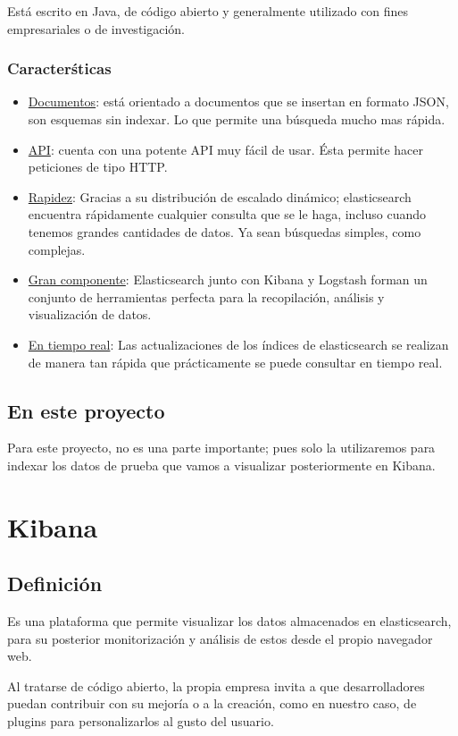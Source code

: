 \documentclass[a4paper, 12pt]{book}
\begin{document}
Est\'a escrito en Java, de c\'odigo abierto y generalmente utilizado con fines empresariales o de investigaci\'on.
\subsubsection{Caracter\'sticas}
\begin{itemize}
\item \underline{Documentos}: est\'a orientado a documentos que se insertan en formato JSON, son esquemas sin indexar. Lo que permite una b\'usqueda mucho mas r\'apida.
\item \underline{API}: cuenta con una potente API muy f\'acil de usar. \'Esta permite hacer peticiones de tipo HTTP.
\item \underline{Rapidez}: Gracias a su distribuci\'on de escalado din\'amico; elasticsearch encuentra r\'apidamente cualquier consulta que se le haga, incluso cuando tenemos grandes cantidades de datos. Ya sean b\'usquedas simples, como complejas.
\item \underline{Gran componente}: Elasticsearch junto con Kibana y Logstash forman un conjunto de herramientas perfecta para la recopilaci\'on, an\'alisis y visualizaci\'on de datos.
\item \underline{En tiempo real}: Las actualizaciones de los \'indices de elasticsearch se realizan de manera tan r\'apida que pr\'acticamente se puede consultar en tiempo real.
\end{itemize}
\subsection{En este proyecto}
Para este proyecto, no es una parte importante; pues solo la utilizaremos para indexar los datos de prueba que vamos a visualizar posteriormente en Kibana.



\section{Kibana}
\label{sec:kibana}
\subsection{Definici\'on}
Es una plataforma que permite visualizar los datos almacenados en elasticsearch, para su posterior monitorizaci\'on y an\'alisis de estos desde el propio navegador web.

Al tratarse de c\'odigo abierto, la propia empresa invita a que desarrolladores puedan contribuir con su mejor\'ia o a la creaci\'on, como en nuestro caso, de plugins para personalizarlos al gusto del usuario. 
\end{document}
